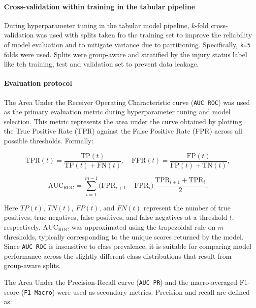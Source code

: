 \paragraph{Cross-validation within training in the tabular pipeline}
During hyperparameter tuning in the tabular model pipeline, $k$-fold cross-validation was used with splits taken fro the training set to improve the reliability of model evaluation and to mitigate variance due to partitioning. Specifically, \texttt{k=5} folds were used. Splits were group-aware and stratified by the injury status label like teh training, test and validation set to prevent data leakage.

\paragraph{Evaluation protocol}
The Area Under the Receiver Operating Characteristic curve (\texttt{AUC ROC}) was used as the primary evaluation metric during hyperparameter tuning and model selection. This metric represents the area under the curve obtained by plotting the True Positive Rate (TPR) against the False Positive Rate (FPR) across all possible thresholds. Formally:

\begin{equation}
    \mathrm{TPR}(t)=\frac{\mathrm{TP}(t)}{\mathrm{TP}(t)+\mathrm{FN}(t)},\quad
    \mathrm{FPR}(t)=\frac{\mathrm{FP}(t)}{\mathrm{FP}(t)+\mathrm{TN}(t)},
\end{equation}

\begin{equation}
    \mathrm{AUC}_{\mathrm{ROC}}
    = \sum_{i=1}^{m-1} \big(\mathrm{FPR}_{i+1}-\mathrm{FPR}_{i}\big)\,
    \frac{\mathrm{TPR}_{i+1}+\mathrm{TPR}_{i}}{2}.
\end{equation}

Here $TP(t)$, $TN(t)$, $FP(t)$, and $FN(t)$ represent the number of true positives, true negatives, false positives, and false negatives at a threshold $t$, respectively. $\mathrm{AUC}_{\mathrm{ROC}}$ was approximated using the trapezoidal rule on $m$ thresholds, typically corresponding to the unique scores returned by the model. Since \texttt{AUC ROC} is insensitive to class prevalence, it is suitable for comparing model performance across the slightly different class distributions that result from group-aware splits.

The Area Under the Precision-Recall curve (\texttt{AUC PR}) and the macro-averaged F1-score (\texttt{F1-Macro}) were used as secondary metrics. Precision and recall are defined as:

